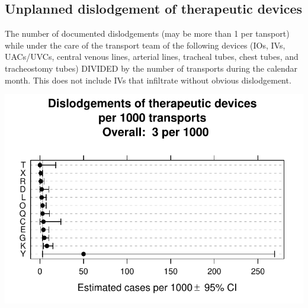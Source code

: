 \documentclass[twoside]{article}\usepackage[]{graphicx}\usepackage[]{color}
\makeatletter
\def\maxwidth{ %
  \ifdim\Gin@nat@width>\linewidth
    \linewidth
  \else
    \Gin@nat@width
  \fi
}
\newenvironment{knitrout}{}{} %
\makeatother
\begin{document}
\newpage
\subsection{Unplanned dislodgement of therapeutic devices}
The number of documented dislodgements (may be more than 1 per tansport) while under the care of the transport team of the following devices (IOs, IVs, UACs/UVCs, central venous lines, arterial lines, tracheal tubes, chest tubes, and tracheostomy tubes) DIVIDED by the number of transports during the calendar month. This does not include IVs that infiltrate without obvious dislodgement.

\begin{center}
\begin{knitrout}
\color{fgcolor}
\includegraphics[width=\maxwidth]{figure/r_unplanned_dislodgement} 

\end{knitrout}

\end{center}
\end{document}
